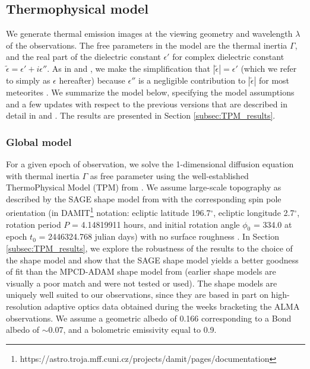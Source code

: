 \documentclass[]{aastex631}
\begin{document}
\subsection{Thermophysical model}
\label{sec:TPM}

We generate thermal emission images at the viewing geometry and wavelength $\lambda$ of the observations. The free parameters in the model are the thermal inertia $\Gamma$, and the real part of the dielectric constant $\epsilon'$ for complex dielectric constant $\tilde{\epsilon} = \epsilon' + i\epsilon''$. As in \citet{dekleer2021} and \citet{cambioni2022}, we make the simplification that $|\tilde{\epsilon}| = \epsilon'$ (which we refer to simply as $\epsilon$ hereafter) because $\epsilon''$ is a negligible contribution to $|\tilde{\epsilon}|$ for most meteorites \citep{campbell1969}. We summarize the model below, specifying the model assumptions and a few updates with respect to the previous versions that are described in detail in \citet{dekleer2021} and \citet{cambioni2022}. The results are presented in Section \ref{subsec:TPM_results}.

\subsubsection{Global model}
\label{sec:global_TPM}

For a given epoch of observation, we solve the 1-dimensional diffusion equation with thermal inertia $\Gamma$ as free parameter using the well-established ThermoPhysical Model (TPM) from \cite{delbo2015}. We assume large-scale topography as described by the SAGE shape model from \citet{ferrais2022} with the corresponding spin pole orientation (in DAMIT\footnote{https://astro.troja.mff.cuni.cz/projects/damit/pages/documentation} notation: ecliptic latitude 196.7$^\circ$, ecliptic longitude 2.7$^\circ$, rotation period $P$ = 4.14819911 hours, and initial rotation angle $\phi_0$ = 334.0 at epoch $t_0$ = 2446324.768 julian days) with no surface roughness \citep{broz2023}. In Section \ref{subsec:TPM_results}, we explore the robustness of the results to the choice of the shape model and show that the SAGE shape model yields a better goodness of fit than the MPCD-ADAM shape model from \citet{ferrais2022} (earlier shape models are visually a poor match and were not tested or used). The \citet{ferrais2022} shape models are uniquely well suited to our observations, since they are based in part on high-resolution adaptive optics data obtained during the weeks bracketing the ALMA observations. We assume a geometric albedo of 0.166 \citep{2019PDSSMainzer} corresponding to a Bond albedo of $\sim$0.07, and a bolometric emissivity equal to 0.9. 
\end{document}
